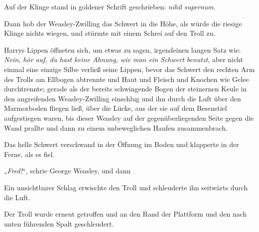 Auf der Klinge stand in goldener Schrift geschrieben: \emph{nihil supernum}.

Dann hob der Weasley-Zwilling das Schwert in die Höhe, als würde die riesige Klinge nichts wiegen, und stürmte mit einem Schrei auf den Troll zu.

Harrys Lippen öffneten sich, um etwas zu sagen, irgendeinen langen Satz wie: \emph{Nein, hör auf, du hast keine Ahnung, wie man ein Schwert benutzt}, aber nicht einmal eine einzige Silbe verließ seine Lippen, bevor das Schwert den rechten Arm des Trolls am Ellbogen abtrennte und Haut und Fleisch und Knochen wie Gelee durchtrennte; gerade als der bereits schwingende Bogen der steinernen Keule in den angreifenden Weasley-Zwilling einschlug und ihn durch die Luft über den Marmorboden fliegen ließ, über die Lücke, aus der sie auf dem Besenstiel aufgestiegen waren, bis dieser Weasley auf der gegenüberliegenden Seite gegen die Wand prallte und dann zu einem unbeweglichen Haufen zusammenbrach.

Das helle Schwert verschwand in der Öffnung im Boden und klapperte in der Ferne, als es fiel.

„\emph{Fred!}“, schrie George Weasley, und dann .

Ein unsichtbarer Schlag erwischte den Troll und schleuderte ihn seitwärts durch die Luft.


Der Troll wurde erneut getroffen und an den Rand der Plattform und den nach unten führenden Spalt geschleudert.

